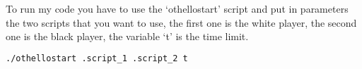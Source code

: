 To run my code you have to use the `othellostart' script and put in parameters the two scripts that you want to use, the first one is the white player, the second one is the black player, the variable `t' is the time limit.

\begin{lstlisting}[language=bash]
./othellostart .script_1 .script_2 t
\end{lstlisting}

